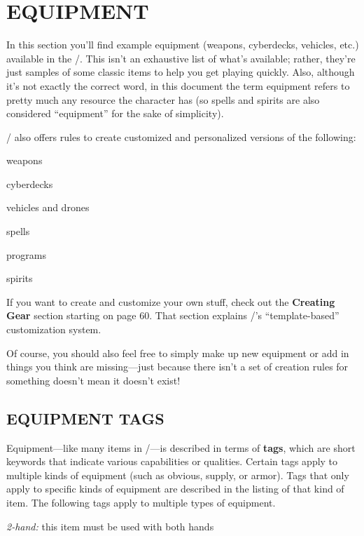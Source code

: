 \documentclass[oneside,10pt]{article}
\begin{document}
\section{EQUIPMENT}
\begin{multicols}{2}
  In this section you’ll find example equipment (weapons, cyberdecks,
  vehicles, etc.) available in the \SW/. This isn’t an exhaustive list
  of what’s available; rather, they’re just samples of some classic
  items to help you get playing quickly.  Also, although it’s not
  exactly the correct word, in this document the term equipment refers
  to pretty much any resource the character has (so spells and spirits
  are also considered ``equipment'' for the sake of simplicity).

  \SW/ also offers rules to create customized and personalized
  versions of the following:
  \begin{dent}

    \tcirc{} weapons

    \tcirc{} cyberdecks

    \tcirc{} vehicles and drones

    \tcirc{} spells

    \tcirc{} programs

    \tcirc{} spirits
  \end{dent}

  If you want to create and customize your own stuff, check out the
  \textbf{Creating Gear} section starting on page 60. That section
  explains \SW/’s ``template-based'' customization system.

  Of course, you should also feel free to simply make up new equipment
  or add in things you think are missing—just because there isn’t a
  set of creation rules for something doesn’t mean it doesn’t exist!

  \subsection{EQUIPMENT TAGS}
  Equipment—like many items in \SW/—is described in terms of
  \textbf{tags}, which are short keywords that indicate various
  capabilities or qualities. Certain tags apply to multiple kinds of
  equipment (such as obvious, supply, or armor). Tags that only apply
  to specific kinds of equipment are described in the listing of that
  kind of item. The following tags apply to multiple types of
  equipment.
  \begin{dent}

    \textit{2-hand:} this item must be used with both hands


\end{dent}
\end{multicols}
\end{document}
